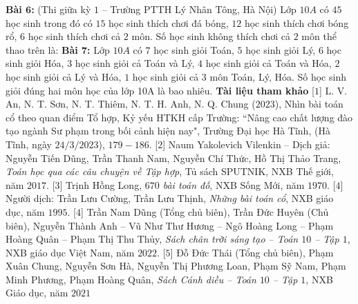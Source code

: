\begin{multicols}{2}
	\vskip 0.1cm
	\textbf{\color{diendantoanhoc}Bài $\pmb6$:} (Thi giữa kỳ $1$ -- Trường PTTH Lý Nhân Tông, Hà Nội) Lớp $10A$ có $45$ học sinh trong đó có $15$ học sinh thích chơi đá bóng, $12$ học sinh thích chơi bóng rổ, $6$ học sinh thích chơi cả $2$ môn. Số học sinh không thích chơi cả $2$ môn thể thao trên là:
	\vskip 0.1cm
	\textbf{\color{diendantoanhoc}Bài $\pmb7$:} Lớp $10A$ có $7$ học sinh giỏi Toán, $5$ học sinh giỏi Lý, $6$ học sinh giỏi Hóa, $3$ học sinh giỏi cả Toán và Lý, $4$ học sinh giỏi cả Toán và Hóa, $2$ học sinh giỏi cả Lý và Hóa, $1$ học sinh giỏi cả $3$ môn Toán, Lý, Hóa. Số học sinh giỏi đúng hai môn học của lớp 10A là bao nhiêu.
	\vskip 0.1cm
	\textbf{\color{diendantoanhoc}Tài liệu tham khảo}
	\vskip 0.1cm
	[$1$]	L. V. An, N. T. Sơn, N. T. Thiêm, N. T. H. Anh, N. Q. Chung ($2023$), Nhìn bài toán cổ theo quan điểm Tổ hợp, Kỷ yếu HTKH cấp Trường: ``Nâng cao chất lượng đào tạo ngành Sư phạm trong bối cảnh hiện nay", Trường Đại học Hà Tĩnh, (Hà Tĩnh, ngày $24/3/2023$), $179 - 186$.
	\vskip 0.1cm
	[$2$] Naum Yakolevich Vilenkin -- Dịch giả: Nguyễn Tiến Dũng, Trần Thanh Nam, Nguyễn Chí Thức, Hồ Thị Thảo Trang, \textit{Toán học qua các câu chuyện về Tập hợp}, Tủ sách SPUTNIK, NXB Thế giới, năm $2017$.
	\vskip 0.1cm
	[$3$] Trịnh Hồng Long, \textit{$670$ bài toán đố}, NXB Sống Mới, năm $1970$.
	\vskip 0.1cm
	[$4$] Người dịch: Trần Lưu Cường, Trần Lưu Thịnh, \textit{Những bài toán cổ}, NXB giáo dục, năm $1995$.
	\vskip 0.1cm
	[$4$] Trần Nam Dũng (Tổng chủ biên), Trần Đức Huyên (Chủ biên), Nguyễn Thành Anh -- Vũ Như Thư Hương -- Ngô Hoàng Long -- Phạm Hoàng Quân -- Phạm Thị Thu Thủy, \textit{Sách chân trời sáng tạo -- Toán $10$ -- Tập $1$}, NXB giáo dục Việt Nam, năm $2022$.
	\vskip 0.1cm
	[$5$]	Đỗ Đức Thái (Tổng chủ biên), Phạm Xuân Chung, Nguyễn Sơn Hà, Nguyễn Thị Phương Loan, Phạm Sỹ Nam, Phạm Minh Phương, Phạm Hoàng Quân, \textit{Sách Cánh diều -- Toán $10$ -- Tập $1$}, NXB Giáo dục, năm $2021$	
\end{multicols}